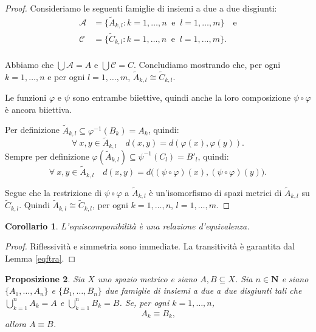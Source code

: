 \documentclass[a4paper,oneside,11pt]{book}
\theoremstyle{definition} \newtheorem{Def}{Definizione}
\theoremstyle{plain} \newtheorem{teo}{Teorema}
\theoremstyle{plain} \newtheorem{cor}[teo]{Corollario}
\theoremstyle{definition} \newtheorem{lem}[teo]{Lemma}
\theoremstyle{plain} \newtheorem{pro}[teo]{Proposizione}
\newcommand{\eqf}{\equiv}
\begin{document}
\begin{proof}
	
		Consideriamo le seguenti famiglie di insiemi a due a due disgiunti:
		\begin{equation*}
			\begin{aligned}
				\mathcal{A} &= \{ \tilde{A}_{k,l} : k = 1, \dots, n\ \text{ e }\ l = 1, \dots, m \} \quad \text{e}\\
				\mathcal{C} &= \{ \tilde{C}_{k,l} : k = 1, \dots, n\ \text{ e }\ l = 1, \dots, m \} \text{.}\\
			\end{aligned}
		\end{equation*}
	
		Abbiamo che $\bigcup\mathcal{A} = A$ e $\bigcup\mathcal{C} = C$. Concludiamo mostrando che, per ogni $k = 1, \dots, n$ e per ogni $l = 1, \dots, m$, $\tilde{A}_{k,l} \cong \tilde{C}_{k,l}$.
	
		Le funzioni $\varphi$ e $\psi$ sono entrambe biiettive, quindi anche la loro composizione $\psi \circ \varphi$ è ancora biiettiva.
	
		Per definizione $\tilde{A}_{k,l} \subseteq \varphi^{-1}(B_k) = A_k$, quindi:
		\begin{equation*}
			\forall\ x,y \in \tilde{A}_{k,l} \quad d(x, y) = d(\varphi(x), \varphi(y)) \text{.}
		\end{equation*}
		Sempre per definizione $\varphi(\tilde{A}_{k,l}) \subseteq \psi^{-1}(C_l) = B'_l$, quindi:
		\begin{equation*}
			\forall\ x,y \in \tilde{A}_{k,l} \quad d(x, y) = d\Big((\psi \circ \varphi)(x), (\psi \circ \varphi)(y)\Big) \text{.}
		\end{equation*}
	
		Segue che la restrizione di $\psi \circ \varphi$ a $\tilde{A}_{k,l}$ è un'isomorfismo di spazi metrici di $\tilde{A}_{k,l}$ su $\tilde{C}_{k,l}$. Quindi $\tilde{A}_{k,l} \cong \tilde{C}_{k,l}$, per ogni $k = 1, \dots, n$, $l = 1, \dots, m$.
	\end{proof}

	\begin{cor}
		L'equiscomponibilità è una relazione d'equivalenza.
	\end{cor}
	
	\begin{proof}
		Riflessività e simmetria sono immediate. La transitività è garantita dal Lemma \ref{eqftra}.
	\end{proof}
	
	\begin{pro}\label{akbkaeqfb} %
		Sia $X$ uno spazio metrico e siano $A,B \subseteq X$. Sia $n \in \mathbf{N}$ e siano $\{A_1, \dots, A_n\}$ e $\{B_1, \dots, B_n\}$ due famiglie di insiemi a due a due disgiunti tali che $\bigcup\limits_{k=1}^n A_k = A$ e $\bigcup\limits_{k=1}^n B_k = B$. Se, per ogni $k = 1, \dots, n$,
		\begin{equation*}
			A_k \eqf B_k \text{,}
		\end{equation*}
		allora $A \eqf B$.
	\end{pro}
	
\end{document}
